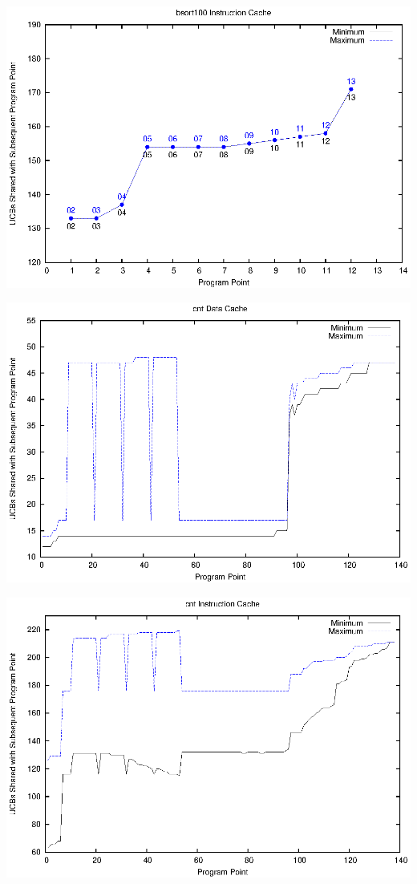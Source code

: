 \begin{center}
  \includegraphics[width=\linewidth]{eps/bsort100-icache.eps}
\end{center}

\begin{center}
  \includegraphics[width=\linewidth]{eps/cnt-dcache.eps}
\end{center}

\begin{center}
  \includegraphics[width=\linewidth]{eps/cnt-icache.eps}
\end{center}

